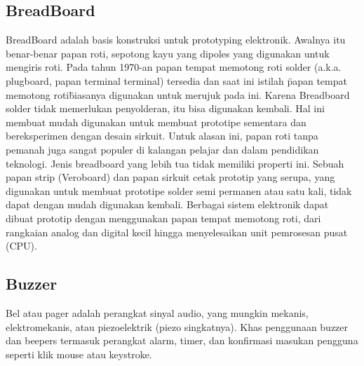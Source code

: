 \subsection{BreadBoard}
BreadBoard adalah basis konstruksi untuk prototyping elektronik. Awalnya itu benar-benar papan roti, sepotong kayu yang dipoles yang digunakan untuk mengiris roti. Pada tahun 1970-an papan tempat memotong roti solder (a.k.a. plugboard, papan terminal terminal) tersedia dan saat ini istilah \"papan tempat memotong roti\" biasanya digunakan untuk merujuk pada ini.
Karena Breadboard solder tidak memerlukan penyolderan, itu bisa digunakan kembali. Hal ini membuat mudah digunakan untuk membuat prototipe sementara dan bereksperimen dengan desain sirkuit. Untuk alasan ini, papan roti tanpa pemanah juga sangat populer di kalangan pelajar dan dalam pendidikan teknologi. Jenis breadboard yang lebih tua tidak memiliki properti ini. Sebuah papan strip (Veroboard) dan papan sirkuit cetak prototip yang serupa, yang digunakan untuk membuat prototipe solder semi permanen atau satu kali, tidak dapat dengan mudah digunakan kembali. Berbagai sistem elektronik dapat dibuat prototip dengan menggunakan papan tempat memotong roti, dari rangkaian analog dan digital kecil hingga menyelesaikan unit pemrosesan pusat (CPU).

\subsection{Buzzer}

	
Bel atau pager adalah perangkat sinyal audio, yang mungkin mekanis, elektromekanis, atau piezoelektrik (piezo singkatnya). Khas penggunaan buzzer dan beepers termasuk 
perangkat alarm, timer, dan konfirmasi masukan pengguna seperti klik mouse atau keystroke.

